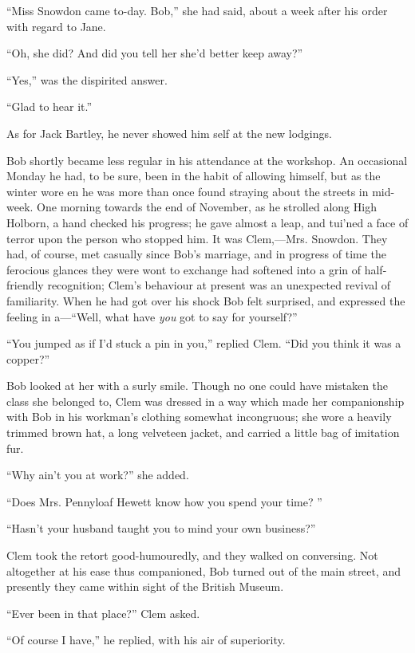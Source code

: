 ``Miss Snowdon came to-day. Bob,'' she had said, about a week after his
order with regard to Jane.

``Oh, she did? And did you tell her she'd better keep away?''

``Yes,'' was the dispirited answer.

{\protect\hypertarget{240}{}{}}``Glad to hear it.''

As for Jack Bartley, he never showed him self at the new lodgings.

Bob shortly became less regular in his attendance at the workshop. An
occasional Monday he had, to be sure, been in the habit of allowing
himself, but as the winter wore en he was more than once found straying
about the streets in mid-week. One morning towards the end of November,
as he strolled along High Holborn, a hand checked his progress; he gave
almost a leap, and tui'ned a face of terror upon the person who stopped
him. It was Clem,---Mrs. Snowdon. They had, of course, met casually
since Bob's marriage, and in progress of time the ferocious glances they
were wont to exchange had softened into a grin of half-friendly
recognition; Clem's behaviour at present was an unexpected revival of
familiarity. When he had got over his shock Bob felt surprised, and
expressed the feeling in a---``Well, what have \emph{you} got to say for
yourself?''

``You jumped as if I'd stuck a pin in you,''
{\protect\hypertarget{241}{}{}}replied Clem. ``Did you think it was a
copper?''

Bob looked at her with a surly smile. Though no one could have mistaken
the class she belonged to, Clem was dressed in a way which made her
companionship with Bob in his workman's clothing somewhat incongruous;
she wore a heavily trimmed brown hat, a long velveteen jacket, and
carried a little bag of imitation fur.

``Why ain't you at work?'' she added.

``Does Mrs. Pennyloaf Hewett know how you spend your time? ''

``Hasn't your husband taught you to mind your own business?''

Clem took the retort good-humouredly, and they walked on conversing. Not
altogether at his ease thus companioned, Bob turned out of the main
street, and presently they came within sight of the British Museum.

``Ever been in that place?'' Clem asked.

``Of course I have,'' he replied, with his air of superiority.

